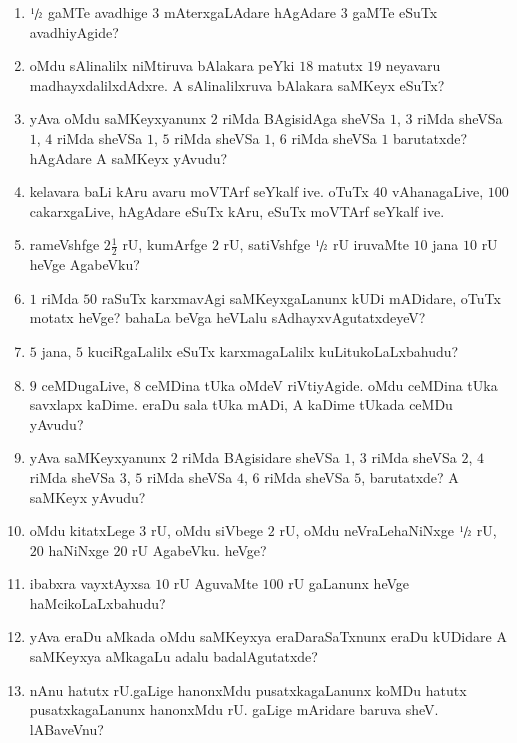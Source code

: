 \begin{enumerate}
\item $\sfrac{1}{2}$ gaMTe avadhige $3$ mAterxgaLAdare hAgAdare $3$ gaMTe eSuTx avadhiyAgide?

\item oMdu sAlinalilx niMtiruva bAlakara peYki $18$ matutx $19$ neyavaru madhayxdalilxdAdxre. A sAlinalilxruva bAlakara saMKeyx eSuTx?

\item yAva oMdu saMKeyxyanunx $2$ riMda BAgisidAga sheVSa $1$, $3$ riMda sheVSa $1$, $4$ riMda sheVSa $1$, $5$ riMda sheVSa $1$, $6$ riMda sheVSa $1$ barutatxde? hAgAdare A saMKeyx yAvudu?

\item kelavara baLi kAru avaru moVTArf seYkalf ive. oTuTx $40$ vAhanagaLive, $100$ cakarxgaLive, hAgAdare eSuTx kAru, eSuTx moVTArf seYkalf ive.

\item rameVshfge $2\frac{1}{2}$ rU, kumArfge $2$ rU, satiVshfge $\sfrac{1}{2}$ rU iruvaMte $10$ jana $10$ rU heVge AgabeVku?

\item $1$ riMda $50$ raSuTx karxmavAgi saMKeyxgaLanunx kUDi mADidare, oTuTx motatx heVge? bahaLa beVga heVLalu sAdhayxvAgutatxdeyeV?

\item $5$ jana, $5$ kuciRgaLalilx eSuTx karxmagaLalilx kuLitukoLaLxbahudu?

\item $9$ ceMDugaLive, $8$ ceMDina tUka oMdeV riVtiyAgide. oMdu ceMDina tUka savxlapx kaDime. eraDu sala tUka mADi, A kaDime tUkada ceMDu yAvudu?

\item yAva saMKeyxyanunx $2$ riMda BAgisidare sheVSa $1$, $3$ riMda sheVSa $2$, $4$ riMda sheVSa $3$, $5$ riMda sheVSa $4$, $6$ riMda sheVSa $5$, barutatxde? A saMKeyx yAvudu?

\item oMdu kitatxLege $3$ rU, oMdu siVbege $2$ rU, oMdu neVraLehaNiNxge $\sfrac{1}{2}$ rU, $20$ haNiNxge $20$ rU AgabeVku. heVge?

\item ibabxra vayxtAyxsa $10$ rU AguvaMte $100$ rU gaLanunx heVge haMcikoLaLx\-bahudu?

\item yAva eraDu aMkada oMdu saMKeyxya eraDaraSaTxnunx eraDu kUDidare A saMKeyxya aMkagaLu adalu badalAgutatxde?

\item nAnu hatutx rU.gaLige hanonxMdu pusatxkagaLanunx koMDu hatutx pusatxkagaLanunx hanonxMdu rU. gaLige mAridare baruva sheV. lABaveVnu?


\end{enumerate}
